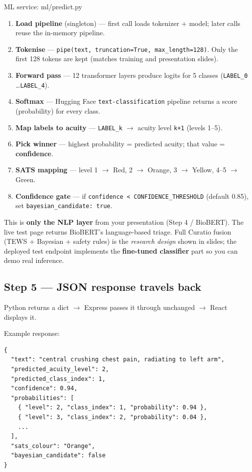\documentclass[11pt]{article}
\begin{document}
\begin{filebox}{ML service: ml/predict.py}
\begin{enumerate}
  \item \textbf{Load pipeline} (singleton) --- first call loads tokenizer + model; later calls reuse
        the in-memory pipeline.
  \item \textbf{Tokenise} --- \texttt{pipe(text, truncation=True, max\_length=128)}. Only the first
        128 tokens are kept (matches training and presentation slides).
  \item \textbf{Forward pass} --- 12 transformer layers produce logits for 5 classes
        (\texttt{LABEL\_0} \ldots \texttt{LABEL\_4}).
  \item \textbf{Softmax} --- Hugging Face \texttt{text-classification} pipeline returns a score
        (probability) for every class.
  \item \textbf{Map labels to acuity} --- \texttt{LABEL\_k} $\to$ acuity level \texttt{k+1} (levels
        1--5).
  \item \textbf{Pick winner} --- highest probability = predicted acuity; that value = \textbf{confidence}.
  \item \textbf{SATS mapping} --- level 1 $\to$ Red, 2 $\to$ Orange, 3 $\to$ Yellow, 4--5 $\to$ Green.
  \item \textbf{Confidence gate} --- if \texttt{confidence < CONFIDENCE\_THRESHOLD} (default 0.85),
        set \texttt{bayesian\_candidate: true}.
\end{enumerate}
\end{filebox}

\begin{idea}
This is \textbf{only the NLP layer} from your presentation (Step 4 / BioBERT). The live test page
returns BioBERT's language-based triage. Full Curatio fusion (TEWS + Bayesian + safety rules) is
the \emph{research design} shown in slides; the deployed test endpoint implements the
\textbf{fine-tuned classifier} part so you can demo real inference.
\end{idea}

\subsection{Step 5 --- JSON response travels back}

Python returns a dict $\to$ Express passes it through unchanged $\to$ React displays it.

Example response:

\begin{lstlisting}
{
  "text": "central crushing chest pain, radiating to left arm",
  "predicted_acuity_level": 2,
  "predicted_class_index": 1,
  "confidence": 0.94,
  "probabilities": [
    { "level": 2, "class_index": 1, "probability": 0.94 },
    { "level": 3, "class_index": 2, "probability": 0.04 },
    ...
  ],
  "sats_colour": "Orange",
  "bayesian_candidate": false
}
\end{lstlisting}
\end{document}
